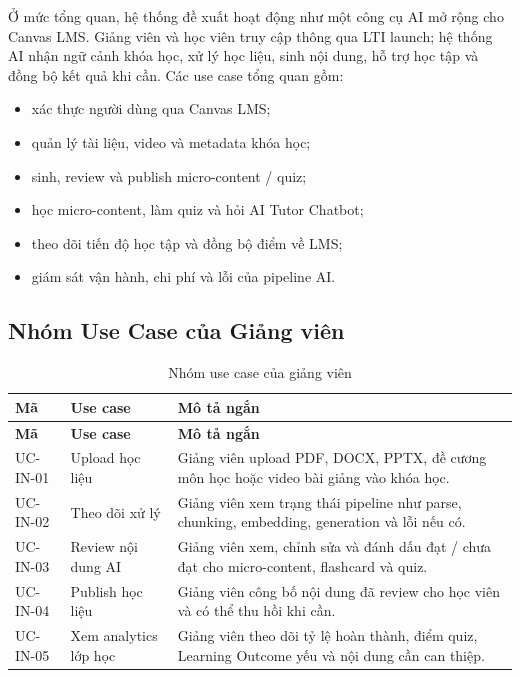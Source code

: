 Ở mức tổng quan, hệ thống đề xuất hoạt động như một công cụ AI mở rộng cho
Canvas LMS. Giảng viên và học viên truy cập thông qua LTI launch; hệ thống AI
nhận ngữ cảnh khóa học, xử lý học liệu, sinh nội dung, hỗ trợ học tập và đồng
bộ kết quả khi cần. Các use case tổng quan gồm:

\begin{itemize}
    \item xác thực người dùng qua Canvas LMS;
    \item quản lý tài liệu, video và metadata khóa học;
    \item sinh, review và publish micro-content / quiz;
    \item học micro-content, làm quiz và hỏi AI Tutor Chatbot;
    \item theo dõi tiến độ học tập và đồng bộ điểm về LMS;
    \item giám sát vận hành, chi phí và lỗi của pipeline AI.
\end{itemize}

\subsection{Nhóm Use Case của Giảng viên}
\label{subsec:use-case-giang-vien}

\begin{longtable}{|p{2.4cm}|p{5.2cm}|p{6.8cm}|}
\caption{Nhóm use case của giảng viên}
\label{tab:use-case-giang-vien}\\
\hline
\textbf{Mã} & \textbf{Use case} & \textbf{Mô tả ngắn} \\
\hline
\endfirsthead
\hline
\textbf{Mã} & \textbf{Use case} & \textbf{Mô tả ngắn} \\
\hline
\endhead
UC-IN-01 & Upload học liệu & Giảng viên upload PDF, DOCX, PPTX, đề cương môn học hoặc video bài giảng vào khóa học. \\
\hline
UC-IN-02 & Theo dõi xử lý & Giảng viên xem trạng thái pipeline như parse, chunking, embedding, generation và lỗi nếu có. \\
\hline
UC-IN-03 & Review nội dung AI & Giảng viên xem, chỉnh sửa và đánh dấu đạt / chưa đạt cho micro-content, flashcard và quiz. \\
\hline
UC-IN-04 & Publish học liệu & Giảng viên công bố nội dung đã review cho học viên và có thể thu hồi khi cần. \\
\hline
UC-IN-05 & Xem analytics lớp học & Giảng viên theo dõi tỷ lệ hoàn thành, điểm quiz, Learning Outcome yếu và nội dung cần can thiệp. \\
\hline
\end{longtable}

